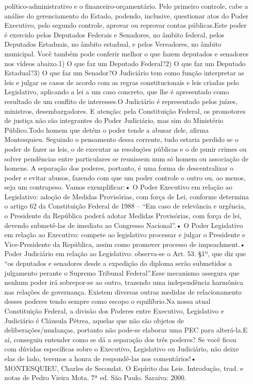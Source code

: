 \documentclass[
   article,       
   12pt,          
   oneside,       
   a4paper,       
   english,       
   brazil,        
   sumario=tradicional
   ]{abntex2}
\begin{document}
político-administrativo e o financeiro-orçamentário. Pelo primeiro controle, cabe a análise do gerenciamento do Estado, podendo, inclusive, questionar atos do Poder Executivo, pelo segundo controle, aprovar ou reprovar contas públicas.Este poder é exercido pelos Deputados Federais e Senadores, no âmbito federal, pelos Deputados Estaduais, no âmbito estadual, e pelos Vereadores, no âmbito municipal. Você também pode conferir melhor o que fazem deputados e senadores nos vídeos abaixo.1) O que faz um Deputado Federal?2) O que faz um Deputado Estadual?3) O que faz um Senador?O Judiciário tem como função interpretar as leis e julgar os casos de acordo com as regras constitucionais e leis criadas pelo Legislativo, aplicando a lei a um caso concreto, que lhe é apresentado como resultado de um conflito de interesses.O Judiciário é representado pelos juízes, ministros, desembargadores. E atenção: pela Constituição Federal, os promotores de justiça não são integrantes do Poder Judiciário, mas sim do Ministério Público.Todo homem que detém o poder tende a abusar dele, afirma Montesquieu. Seguindo o pensamento dessa corrente, tudo estaria perdido se o poder de fazer as leis, o de executar as resoluções públicas e o de punir crimes ou solver pendências entre particulares se reunissem num só homem ou associação de homens. A separação dos poderes, portanto, é uma forma de descentralizar o poder e evitar abusos, fazendo com que um poder controle o outro ou, ao menos, seja um contrapeso. Vamos exemplificar:• O Poder Executivo em relação ao Legislativo: adoção de Medidas Provisórias, com força de Lei, conforme determina o artigo 62 da Constituição Federal de 1988 – “Em caso de relevância e urgência, o Presidente da República poderá adotar Medidas Provisórias, com força de lei, devendo submetê-las de imediato ao Congresso Nacional”.• O Poder Legislativo em relação ao Executivo: compete ao legislativo processar e julgar o Presidente e Vice-Presidente da República, assim como promover processo de impeachment.• Poder Judiciário em relação ao Legislativo: observa-se o Art. 53. §1º, que diz que “os deputados e senadores desde a expedição do diploma serão submetidos a julgamento perante o Supremo Tribunal Federal”.Esse mecanismo assegura que nenhum poder irá sobrepor-se ao outro, trazendo uma independência harmônica nas relações de governança. Existem diversas outras medidas de relacionamento desses poderes tendo sempre como escopo o equilíbrio.Na nossa atual Constituição Federal, a divisão dos Poderes entre Executivo, Legislativo e Judiciário é Cláusula Pétrea, aquelas que não são objetos de deliberações/mudanças, portanto não pode-se elaborar uma PEC para alterá-la.E aí, conseguiu entender como se dá a separação dos três poderes? Se você ficou com dúvidas específicas sobre o Executivo, Legislativo ou Judiciário, não deixe elas de lado, teremos a honra de respondê-las nos comentários!• MONTESQUIEU, Charles de Secondat. O Espírito das Leis. Introdução, trad. e notas de Pedro Vieira Mota. 7ª ed. São Paulo. Saraiva: 2000.
\end{document}
